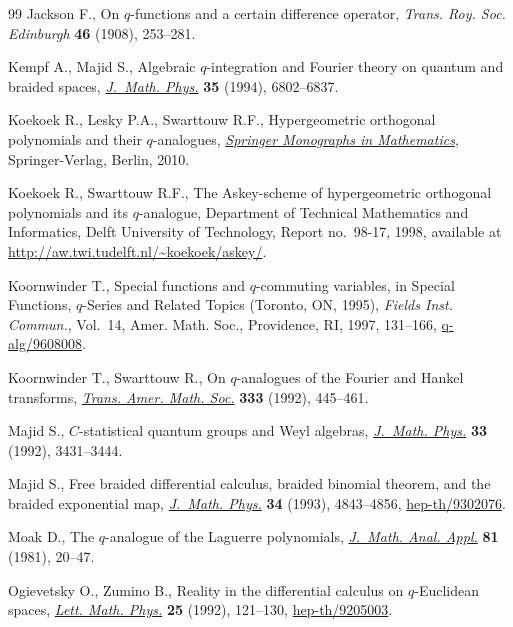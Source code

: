 \documentclass[11pt]{article}
\numberwithin{equation}{section}
\begin{document}
\begin{thebibliography}{99}
Jackson F.,
On $q$-functions and a certain dif\/ference operator,
{\it Trans. Roy. Soc. Edinburgh} {\bf 46} (1908), 253--281.

Kempf A., Majid S.,
Algebraic $q$-integration and Fourier theory on quantum and braided spaces,
\href{http://dx.doi.org/10.1063/1.530644}{{\it J.~Math. Phys.}} {\bf 35} (1994), 6802--6837.

Koekoek R., Lesky P.A., Swarttouw R.F.,
Hypergeometric orthogonal polynomials and their $q$-analogues,
\href{http://dx.doi.org/10.1007/978-3-642-05014-5}{{\it Springer Monographs in Mathematics}}, Springer-Verlag, Berlin, 2010.

Koekoek R., Swarttouw R.F.,
The Askey-scheme of hypergeometric orthogonal polyno\-mials and its $q$-analogue,
Department of Technical Mathematics and Informatics,
Delft University of Technology, Report no.~98-17, 1998, available at \url{http://aw.twi.tudelft.nl/~koekoek/askey/}.


Koornwinder T.,
Special functions and $q$-commuting variables,
in Special Functions, $q$-Series and Related Topics (Toronto, ON, 1995), {\it Fields Inst. Commun.}, Vol.~14, Amer. Math. Soc., Providence, RI, 1997, 131--166,
\href{http://arxiv.org/abs/q-alg/9608008}{q-alg/9608008}.

Koornwinder T., Swarttouw R.,
On $q$-analogues of the Fourier and Hankel transforms,
\href{http://dx.doi.org/10.2307/2154118}{{\it Trans. Amer. Math. Soc.}} {\bf333} (1992), 445--461.

Majid S.,
$C$-statistical quantum groups and Weyl algebras,
\href{http://dx.doi.org/10.1063/1.529891}{{\it J.~Math. Phys.}} {\bf33} (1992), 3431--3444.


Majid S.,
Free braided dif\/ferential calculus, braided binomial theorem, and the braided exponential map,
\href{http://dx.doi.org/10.1063/1.530326}{{\it J.~Math. Phys.}} {\bf34} (1993), 4843--4856,
\href{http://arxiv.org/abs/hep-th/9302076}{hep-th/9302076}.

Moak D.,
The $q$-analogue of the Laguerre polynomials,
\href{http://dx.doi.org/10.1016/0022-247X(81)90048-2}{{\it J.~Math. Anal. Appl.}} {\bf81} (1981), 20--47.

Ogievetsky O., Zumino B.,
Reality in the dif\/ferential calculus on $q$-Euclidean spaces,
\href{http://dx.doi.org/10.1007/BF00398308}{{\it Lett. Math. Phys.}} {\bf25} (1992), 121--130,
\href{http://arxiv.org/abs/hep-th/9205003}{hep-th/9205003}.


\end{thebibliography}
\end{document}
